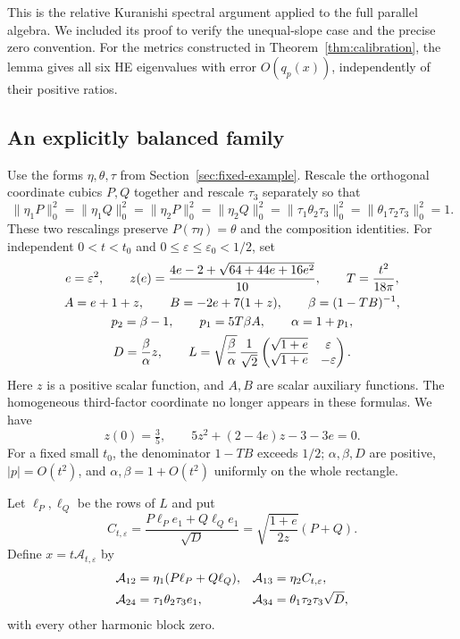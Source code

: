 \documentclass[11pt]{amsart}
\theoremstyle{definition}
\theoremstyle{remark}
\begin{document}
This is the relative Kuranishi spectral argument applied to the full
parallel algebra. We included its proof to verify the unequal-slope
case and the precise zero convention. For the metrics constructed in
Theorem~\ref{thm:calibration}, the lemma gives all six HE eigenvalues
with error $O(q_p(x))$, independently of their positive ratios.

\subsection{An explicitly balanced family}
Use the forms $\eta,\theta,\tau$ from Section~\ref{sec:fixed-example}.
Rescale the orthogonal coordinate cubics $P,Q$ together and rescale
$\tau_3$ separately so that
\begin{equation}\label{eq:balanced-normalization}
 \|\eta_1P\|_0^2=\|\eta_1Q\|_0^2
 =\|\eta_2P\|_0^2=\|\eta_2Q\|_0^2
 =\|\tau_1\theta_2\tau_3\|_0^2
 =\|\theta_1\tau_2\tau_3\|_0^2=1.
\end{equation}
These two rescalings preserve $P(\tau\eta)=\theta$ and the
composition identities. For independent $0<t<t_0$ and
$0\le\varepsilon\le\varepsilon_0<1/2$, set
\begin{gather}
 e=\varepsilon^2,\qquad
 z(e)=\frac{4e-2+\sqrt{64+44e+16e^2}}{10},\qquad
 T=\frac{t^2}{18\pi},\label{eq:balanced-z}\\
 A=e+1+z,\qquad B=-2e+7(1+z),\qquad
 \beta=(1-TB)^{-1},\notag\\
 p_2=\beta-1,\qquad
 p_1=5T\beta A,\qquad \alpha=1+p_1,\label{eq:balanced-parameters}\\
 D=\frac\beta\alpha z,\qquad
 L=\sqrt{\frac\beta\alpha}\,\frac1{\sqrt2}
 \begin{pmatrix}\sqrt{1+e}&\varepsilon\\
                 \sqrt{1+e}&-\varepsilon\end{pmatrix}.
 \label{eq:balanced-rows}
\end{gather}
Here $z$ is a positive scalar function, and $A,B$ are scalar
auxiliary functions. The homogeneous third-factor coordinate no longer
appears in these formulas. We have
\begin{equation}\label{eq:z-identity}
 z(0)=\tfrac35,\qquad 5z^2+(2-4e)z-3-3e=0.
\end{equation}
For a fixed small $t_0$, the denominator $1-TB$ exceeds $1/2$;
$\alpha,\beta,D$ are positive, $|p|=O(t^2)$, and
$\alpha,\beta=1+O(t^2)$ uniformly on the whole rectangle.

Let $\ell_P,\ell_Q$ be the rows of $L$ and put
\[
 C_{t,\varepsilon}=\frac{P\ell_Pe_1+Q\ell_Qe_1}{\sqrt D}
                  =\sqrt{\frac{1+e}{2z}}(P+Q).
\]
Define $x=t\mathcal A_{t,\varepsilon}$ by
\begin{align}
 \mathcal A_{12}&=\eta_1(P\ell_P+Q\ell_Q),&
 \mathcal A_{13}&=\eta_2C_{t,\varepsilon},\notag\\
 \mathcal A_{24}&=\tau_1\theta_2\tau_3e_1,&
 \mathcal A_{34}&=\theta_1\tau_2\tau_3\sqrt D,
 \label{eq:balanced-family}
\end{align}
with every other harmonic block zero.
\end{document}
